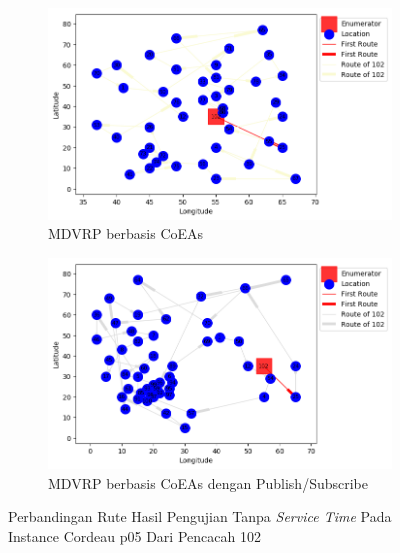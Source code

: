 \begin{figure}[H]
	\centering
	\begin{subfigure}[t]{\textwidth}
		\centering
		\includegraphics[width=\textwidth]{Resources/Images/cordeau_p05/cordeau_p05_notw_102_coes}
		\caption{MDVRP berbasis CoEAs}
		\label{fig:cordeau_p05_notw_102_coes}
	\end{subfigure}
	\begin{subfigure}[t]{\textwidth}
		\centering
		\includegraphics[width=\textwidth]{Resources/Images/cordeau_p05/cordeau_p05_notw_102_pubsub_coes}
		\caption{MDVRP berbasis CoEAs dengan Publish/Subscribe}
		\label{fig:cordeau_p05_notw_102_pubsub_coes}
	\end{subfigure}
	\caption{Perbandingan Rute Hasil Pengujian Tanpa \textit{Service Time} Pada Instance Cordeau p05 Dari Pencacah 102}
	\label{fig:cordeau_p05_notw_102}
\end{figure}


